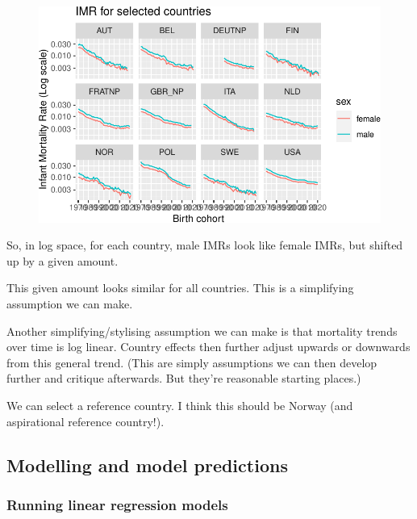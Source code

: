 \documentclass[
  letterpaper,
  DIV=11,
  numbers=noendperiod]{scrartcl}
\begin{document}
\begin{figure}[H]

{\centering \includegraphics{main_notebook_files/figure-pdf/unnamed-chunk-5-1.pdf}

}

\end{figure}

So, in log space, for each country, male IMRs look like female IMRs, but
shifted up by a given amount.

This given amount looks similar for all countries. This is a simplifying
assumption we can make.

Another simplifying/stylising assumption we can make is that mortality
trends over time is log linear. Country effects then further adjust
upwards or downwards from this general trend. (This are simply
assumptions we can then develop further and critique afterwards. But
they're reasonable starting places.)

We can select a reference country. I think this should be Norway (and
aspirational reference country!).

\hypertarget{modelling-and-model-predictions}{%
\subsection{Modelling and model
predictions}\label{modelling-and-model-predictions}}

\hypertarget{running-linear-regression-models}{%
\subsubsection{Running linear regression
models}\label{running-linear-regression-models}}
\end{document}
